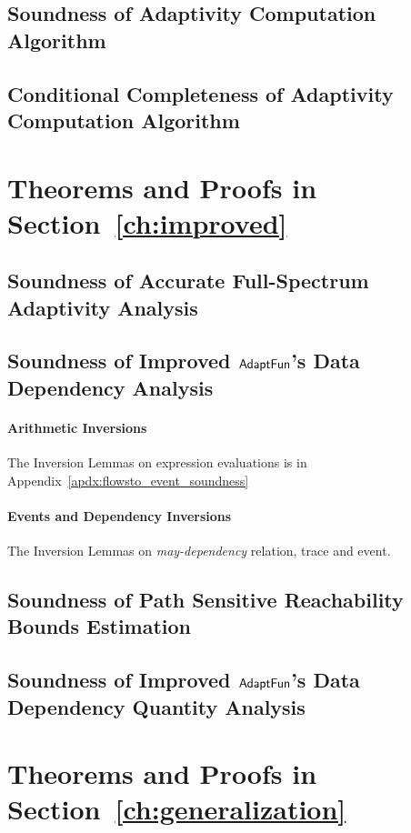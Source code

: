 \subsection{Soundness of Adaptivity Computation Algorithm}
\label{apdx:adaptalg_soundness}

\subsection{Conditional Completeness of Adaptivity Computation Algorithm}
\label{apdx:adaptalg_completeness}

\clearpage

\section{Theorems and Proofs in Section~\ref{ch:improved}}
\label{appendix:thm-improved}
\subsection{Soundness of Accurate Full-Spectrum Adaptivity Analysis}
\label{apdx:adapt_soundness_extend}


\clearpage
\subsection{Soundness of Improved $\textsf{AdaptFun}$'s Data Dependency Analysis}
\label{apdx:flowsto_soundness_extend}

\paragraph*{Arithmetic Inversions}
The Inversion Lemmas on expression evaluations is in Appendix~\ref{apdx:flowsto_event_soundness}
\paragraph*{Events and Dependency Inversions}
The Inversion Lemmas on \emph{may-dependency} relation, trace and event.

\clearpage
\subsection{Soundness of Path Sensitive Reachability Bounds Estimation}
\label{apdx:ps_reachability_soundness}

\clearpage
\subsection{Soundness of Improved $\textsf{AdaptFun}$'s Data Dependency Quantity Analysis}
\label{apdx:edgeweight_soundness}

\clearpage

\section{Theorems and Proofs in Section~\ref{ch:generalization}}
\label{appendix:thm-generalization}
% 
\clearpage
